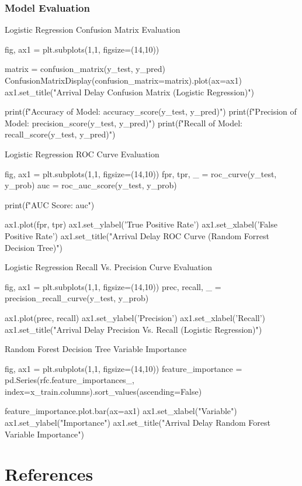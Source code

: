 \documentclass[a4paper,12pt]{article}
\begin{document}
\subsubsection{Model Evaluation}

Logistic Regression Confusion Matrix Evaluation

\begin{python}
fig, ax1 = plt.subplots(1,1, figsize=(14,10))

matrix = confusion_matrix(y_test, y_pred)
ConfusionMatrixDisplay(confusion_matrix=matrix).plot(ax=ax1)
ax1.set_title("Arrival Delay Confusion Matrix (Logistic Regression)")

print(f"Accuracy of Model: {accuracy_score(y_test, y_pred)}")
print(f"Precision of Model: {precision_score(y_test, y_pred)}")
print(f"Recall of Model: {recall_score(y_test, y_pred)}")
\end{python}

Logistic Regression ROC Curve Evaluation
\begin{python}
fig, ax1 = plt.subplots(1,1, figsize=(14,10))
fpr, tpr, _ = roc_curve(y_test, y_prob)
auc = roc_auc_score(y_test, y_prob)

print(f"AUC Score: {auc}")

ax1.plot(fpr, tpr)
ax1.set_ylabel('True Positive Rate')
ax1.set_xlabel('False Positive Rate')
ax1.set_title("Arrival Delay ROC Curve (Random Forrest Decision Tree)")
\end{python}

Logistic Regression Recall Vs. Precision Curve Evaluation
\begin{python}
fig, ax1 = plt.subplots(1,1, figsize=(14,10))
prec, recall, _ = precision_recall_curve(y_test, y_prob)

ax1.plot(prec, recall)
ax1.set_ylabel('Precision')
ax1.set_xlabel('Recall')
ax1.set_title("Arrival Delay Precision Vs. Recall (Logistic Regression)")


\end{python}

Random Forest Decision Tree Variable Importance

\begin{python}
fig, ax1 = plt.subplots(1,1, figsize=(14,10))
feature_importance = pd.Series(rfc.feature_importances_, index=x_train.columns).sort_values(ascending=False)

feature_importance.plot.bar(ax=ax1)
ax1.set_xlabel("Variable")
ax1.set_ylabel("Importance")
ax1.set_title("Arrival Delay  Random Forest Variable Importance")
\end{python}


\pagebreak

\section{References}


\end{document}
